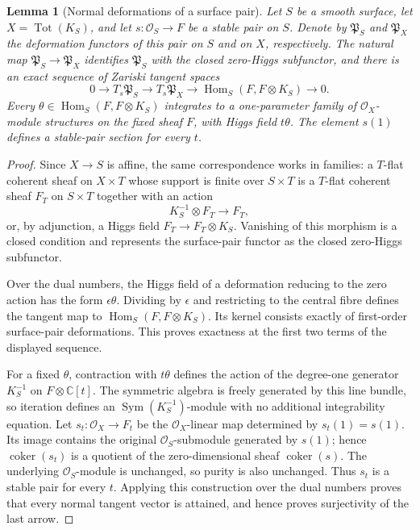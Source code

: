 \documentclass[11pt,reqno]{amsart}
\newtheorem{lemma}[theorem]{Lemma}
\theoremstyle{definition}
\newcommand{\C}{\mathbb C}
\newcommand{\Ocal}{\mathcal O}
\newcommand{\Hom}{\operatorname{Hom}}
\newcommand{\Tot}{\operatorname{Tot}}
\begin{document}
\begin{lemma}[Normal deformations of a surface pair]
\label{lem:normal-deformations-surface-pair}
Let $S$ be a smooth surface, let $X=\Tot(K_S)$, and let
$s:\Ocal_S\to F$ be a stable pair on $S$.  Denote by $\mathfrak P_S$ and
$\mathfrak P_X$ the deformation functors of this pair on $S$ and on $X$,
respectively.  The natural map $\mathfrak P_S\to\mathfrak P_X$ identifies
$\mathfrak P_S$ with the closed zero-Higgs subfunctor, and there is an exact
sequence of Zariski tangent spaces
\[
 0\longrightarrow T_s\mathfrak P_S\longrightarrow T_s\mathfrak P_X
 \longrightarrow\Hom_S(F,F\otimes K_S)\longrightarrow0.
\]
Every $\theta\in\Hom_S(F,F\otimes K_S)$ integrates to a one-parameter
family of $\Ocal_X$-module structures on the fixed sheaf $F$, with Higgs
field $t\theta$.  The element $s(1)$ defines a stable-pair section for every
$t$.
\end{lemma}

\begin{proof}
Since $X\to S$ is affine, the same correspondence works in families: a
$T$-flat coherent sheaf on $X\times T$ whose support is finite over
$S\times T$ is a $T$-flat coherent sheaf $F_T$ on $S\times T$ together
with an action
\[
 K_S^{-1}\otimes F_T\longrightarrow F_T,
\]
or, by adjunction, a Higgs field $F_T\to F_T\otimes K_S$.  Vanishing of
this morphism is a closed condition and represents the surface-pair functor
as the closed zero-Higgs subfunctor.

Over the dual numbers, the Higgs field of a deformation reducing to the
zero action has the form $\epsilon\theta$.  Dividing by $\epsilon$ and
restricting to the central fibre defines the tangent map to
$\Hom_S(F,F\otimes K_S)$.  Its kernel consists exactly of first-order
surface-pair deformations.  This proves exactness at the first two terms of
the displayed sequence.

For a fixed $\theta$, contraction with $t\theta$ defines the action of the
degree-one generator $K_S^{-1}$ on $F\otimes\C[t]$.  The symmetric algebra
is freely generated by this line bundle, so iteration defines an
$\operatorname{Sym}(K_S^{-1})$-module with no additional integrability
equation.  Let $s_t:\Ocal_X\to F_t$ be the $\Ocal_X$-linear map determined
by $s_t(1)=s(1)$.  Its image contains the original $\Ocal_S$-submodule
generated by $s(1)$; hence $\operatorname{coker}(s_t)$ is a quotient of the
zero-dimensional sheaf $\operatorname{coker}(s)$.  The underlying
$\Ocal_S$-module is unchanged, so purity is also unchanged.  Thus $s_t$ is
a stable pair for every $t$.  Applying this construction over the dual
numbers proves that every normal tangent vector is attained, and hence
proves surjectivity of the last arrow.
\end{proof}
\end{document}
